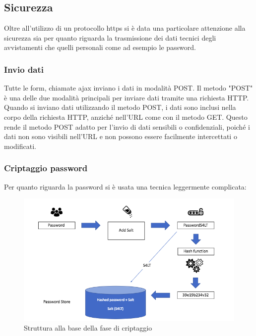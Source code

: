 \documentclass[a4paper,final,12pt]{report}
\begin{document}
\subsection{Sicurezza}
Oltre all'utilizzo di un protocollo https si è data una particolare attenzione alla sicurezza sia per quanto riguarda la trasmissione dei dati tecnici degli avvistamenti che quelli personali come ad esempio le password.
\subsubsection{Invio dati} 
Tutte le form, chiamate ajax inviano i dati in modalità POST. Il metodo "POST" è una delle due modalità principali per inviare dati tramite una richiesta HTTP. Quando si inviano dati utilizzando il metodo POST, i dati sono inclusi nella corpo della richiesta HTTP, anziché nell'URL come con il metodo GET. Questo rende il metodo POST adatto per l'invio di dati sensibili o confidenziali, poiché i dati non sono visibili nell'URL e non possono essere facilmente intercettati o modificati.

\subsubsection{Criptaggio password} 
Per quanto riguarda la password si è usata una tecnica leggermente complicata:
\begin{figure}[hbtp]
\centering
\includegraphics[scale=0.42]{img_concettuale/sale.png}
\caption{Struttura alla base della fase di criptaggio}
\end{figure}
 
\end{document}
